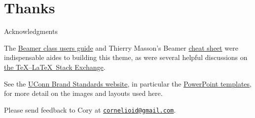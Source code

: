 \documentclass{beamer}
\begin{document}
\section{Thanks}


\begin{frame}{Acknowledgments}

The \href{http://tug.ctan.org/macros/latex/contrib/beamer/doc/beameruserguide.pdf}{Beamer class users guide} and Thierry Masson's Beamer \href{http://www.cpt.univ-mrs.fr/~masson/latex/Beamer-appearance-cheat-sheet.pdf}{cheat sheet} were indispensable aides to building this theme, as were several helpful discussions on \href{https://tex.stackexchange.com/}{the \TeX--\LaTeX\ Stack Exchange}.

See the \href{http://brand.uconn.edu/}{UConn Brand Standards website}, in particular the \href{http://brand.uconn.edu/resources/powerpoint-templates/}{PowerPoint templates}, for more detail on the images and layouts used here.

Please send feedback to Cory at \href{mailto:cornelioid@gmail.com}{\tt cornelioid@gmail.com}.

\end{frame}
\end{document}
